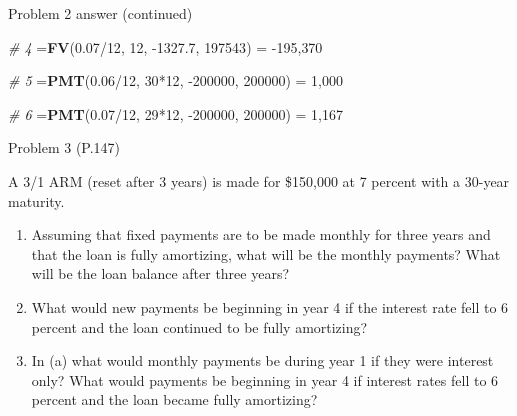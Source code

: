 \documentclass[ignorenonframetext,]{beamer}
\newenvironment{Shaded}{\begin{snugshade}}{\end{snugshade}}
\newcommand{\KeywordTok}[1]{\textcolor[rgb]{0.13,0.29,0.53}{\textbf{{#1}}}}
\newcommand{\DecValTok}[1]{\textcolor[rgb]{0.00,0.00,0.81}{{#1}}}
\newcommand{\FloatTok}[1]{\textcolor[rgb]{0.00,0.00,0.81}{{#1}}}
\newcommand{\StringTok}[1]{\textcolor[rgb]{0.31,0.60,0.02}{{#1}}}
\newcommand{\CommentTok}[1]{\textcolor[rgb]{0.56,0.35,0.01}{\textit{{#1}}}}
\newcommand{\NormalTok}[1]{{#1}}
\providecommand{\tightlist}{%
\setlength{\itemsep}{0pt}\setlength{\parskip}{0pt}}
\begin{document}
\begin{frame}[fragile]{Problem 2 answer (continued)}

\begin{Shaded}
\begin{Highlighting}[]
\CommentTok{# 4}
\NormalTok{=}\KeywordTok{FV}\NormalTok{(}\FloatTok{0.07}\NormalTok{/}\DecValTok{12}\NormalTok{, }\DecValTok{12}\NormalTok{, -}\FloatTok{1327.7}\NormalTok{, }\DecValTok{197543}\NormalTok{) =}\StringTok{ }\NormalTok{-}\DecValTok{195}\NormalTok{,}\DecValTok{370}

\CommentTok{# 5 }
\NormalTok{=}\KeywordTok{PMT}\NormalTok{(}\FloatTok{0.06}\NormalTok{/}\DecValTok{12}\NormalTok{, }\DecValTok{30}\NormalTok{*}\DecValTok{12}\NormalTok{, -}\DecValTok{200000}\NormalTok{, }\DecValTok{200000}\NormalTok{) =}\StringTok{ }\DecValTok{1}\NormalTok{,}\DecValTok{000}

\CommentTok{# 6}
\NormalTok{=}\KeywordTok{PMT}\NormalTok{(}\FloatTok{0.07}\NormalTok{/}\DecValTok{12}\NormalTok{, }\DecValTok{29}\NormalTok{*}\DecValTok{12}\NormalTok{, -}\DecValTok{200000}\NormalTok{, }\DecValTok{200000}\NormalTok{) =}\StringTok{ }\DecValTok{1}\NormalTok{,}\DecValTok{167}
\end{Highlighting}
\end{Shaded}

\normalsize

\end{frame}

\begin{frame}{Problem 3 (P.147)}

\small

A 3/1 ARM (reset after 3 years) is made for \$150,000 at 7 percent with
a 30-year maturity.

\begin{enumerate}
\def\labelenumi{\alph{enumi}.}
\tightlist
\item
  Assuming that fixed payments are to be made monthly for three years
  and that the loan is fully amortizing, what will be the monthly
  payments? What will be the loan balance after three years?
\item
  What would new payments be beginning in year 4 if the interest rate
  fell to 6 percent and the loan continued to be fully amortizing?
\item
  In (a) what would monthly payments be during year 1 if they were
  interest only? What would payments be beginning in year 4 if interest
  rates fell to 6 percent and the loan became fully amortizing?
\end{enumerate}

\end{frame}
\end{document}
